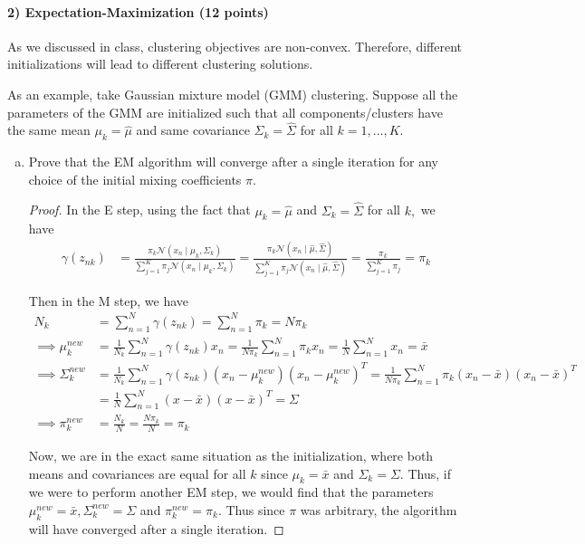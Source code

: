 \documentclass{article}
\begin{document}
\paragraph{2) Expectation-Maximization (12 points)} 

As we discussed in class, clustering objectives are non-convex. Therefore, different initializations will lead to different clustering solutions.

As an example, take Gaussian mixture model (GMM) clustering. Suppose all the parameters of the GMM are initialized such that all components/clusters have the same mean $\mu_k=\hat{\mu}$ and same covariance $\Sigma_k=\hat{\Sigma}$ for all $k=1,\ldots,K$.
\begin{enumerate}[(a)]
	\item Prove that the EM
		algorithm will converge after a single iteration for any choice of the initial mixing coefficients $\pi$.
		\begin{proof}
			In the E step, using the fact that $\mu_k=\hat\mu$ and $\Sigma_k=\hat\Sigma$ for all $k,$ we have
			\begin{align*}
				\gamma(z_{nk}) &= \frac{\pi_k \mathcal N\left(x_n\mid \mu_k, \Sigma_k\right)}{\sum_{j=1}^{K}\pi_j \mathcal N\left( x_n\mid \mu_k, \Sigma_k \right)} = \frac{\pi_k \mathcal N\left( x_n\mid \hat\mu, \hat\Sigma \right)}{\sum_{j=1}^{K} \pi_j \mathcal N\left( x_n\mid \hat\mu, \hat\Sigma \right)} = \frac{\pi_k}{\sum_{j=1}^{K}\pi_j} = \pi_k
			\end{align*}

			Then in the M step, we have
			\begin{align*}
				N_k &= \sum_{n=1}^{N} \gamma(z_{nk}) = \sum_{n=1}^{N} \pi_k = N\pi_k \\
				\implies \mu_k^{new} &= \frac{1}{N_k} \sum_{n=1}^{N} \gamma(z_{nk}) x_n = \frac{1}{N\pi_k} \sum_{n=1}^{N} \pi_k x_n = \frac{1}{N} \sum_{n=1}^{N} x_n = \bar x \\
				\implies\Sigma_k^{new} &= \frac{1}{N_k} \sum_{n=1}^{N} \gamma(z_{nk}) \left( x_n-\mu_k^{new} \right)\left( x_n-\mu_k^{new} \right)^T = \frac{1}{N\pi_k} \sum_{n=1}^{N} \pi_k \left( x_n- \bar x\right) \left( x_n-\bar x \right)^T \\
				&= \frac{1}{N} \sum_{n=1}^{N} \left( x-\bar x \right)\left( x-\bar x \right)^T = \Sigma \\
				\implies \pi_k^{new} &= \frac{N_k}{N} = \frac{N\pi_k}{N} = \pi_k
			\end{align*}

			Now, we are in the exact same situation as the initialization, where both means and covariances are equal for all $k$ since $\mu_k=\bar x$ and $\Sigma_k=\Sigma.$ Thus, if we were to perform another EM step, we would find that the parameters $\mu_k^{new} = \bar x, \Sigma_k^{new}=\Sigma$ and $\pi_k^{new} = \pi_k.$ Thus since $\pi$ was arbitrary, the algorithm will have converged after a single iteration.
		\end{proof}


\end{enumerate}
\end{document}
